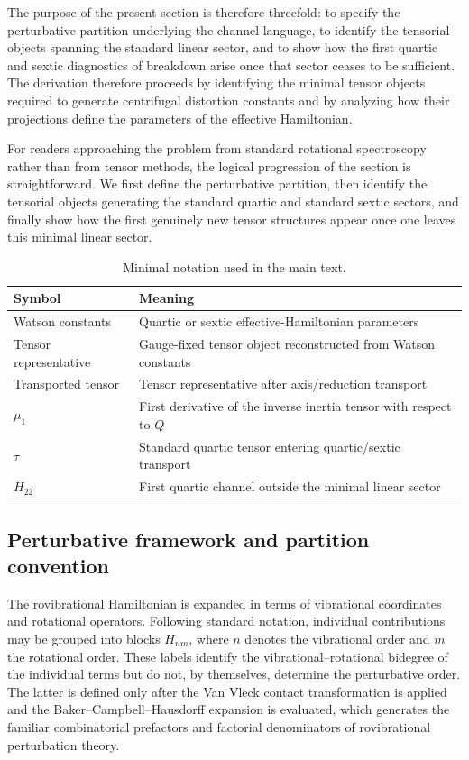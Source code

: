\documentclass[aip,jcp,reprint,floatfix]{revtex4-2}
\begin{document}
The purpose of the present section is therefore threefold: to specify
the perturbative partition underlying the channel language, to identify
the tensorial objects spanning the standard linear sector, and to show
how the first quartic and sextic diagnostics of breakdown arise once
that sector ceases to be sufficient.
The derivation therefore proceeds by identifying the minimal tensor
objects required to generate centrifugal distortion constants and by
analyzing how their projections define the parameters of the effective
Hamiltonian.

For readers approaching the problem from standard rotational
spectroscopy rather than from tensor methods, the logical progression
of the section is straightforward. We first define the perturbative
partition, then identify the tensorial objects generating the standard
quartic and standard sextic sectors, and finally show how the first
genuinely new tensor structures appear once one leaves this minimal
linear sector.

\begin{table}[t]
\centering
\caption{Minimal notation used in the main text.}
\begin{tabular}{ll}
\hline
Symbol & Meaning \\
\hline
Watson constants & Quartic or sextic effective-Hamiltonian parameters \\
Tensor representative & Gauge-fixed tensor object reconstructed from Watson constants \\
Transported tensor & Tensor representative after axis/reduction transport \\
$\mu_1$ & First derivative of the inverse inertia tensor with respect to $Q$ \\
$\tau$ & Standard quartic tensor entering quartic/sextic transport \\
$H_{22}$ & First quartic channel outside the minimal linear sector \\
\hline
\end{tabular}
\end{table}


\subsection{Perturbative framework and partition convention}

The rovibrational Hamiltonian is expanded in terms of vibrational
coordinates and rotational operators. Following standard notation,
individual contributions may be grouped into blocks $H_{nm}$, where
$n$ denotes the vibrational order and $m$ the rotational order.
These labels identify the vibrational--rotational bidegree of the
individual terms but do not, by themselves, determine the perturbative
order. The latter is defined only after the Van Vleck contact
transformation is applied and the Baker--Campbell--Hausdorff expansion
is evaluated, which generates the familiar combinatorial prefactors
and factorial denominators of rovibrational perturbation
theory.\cite{Watson1967,Watson1968,Watson1968JCP,AlievWatson1976,VanVleck1932}
\end{document}
